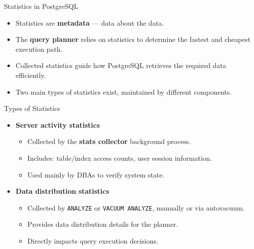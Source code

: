 \documentclass[aspectratio=169]{beamer}
\begin{document}
\begin{frame}{Statistics in PostgreSQL}
  \begin{itemize}
    \item Statistics are \textbf{metadata} — data about the data.
    \item The \textbf{query planner} relies on statistics to determine the fastest and cheapest execution path.
    \item Collected statistics guide how PostgreSQL retrieves the required data efficiently.
    \item Two main types of statistics exist, maintained by different components.
  \end{itemize}
\end{frame}

\begin{frame}{Types of Statistics}
  \begin{itemize}
    \item \textbf{Server activity statistics}
      \begin{itemize}
        \item Collected by the \textbf{stats collector} background process.
        \item Includes: table/index access counts, user session information.
        \item Used mainly by DBAs to verify system state.
      \end{itemize}
    \vspace{0.3cm}
    \item \textbf{Data distribution statistics}
      \begin{itemize}
        \item Collected by \texttt{ANALYZE} or \texttt{VACUUM ANALYZE}, manually or via autovacuum.
        \item Provides data distribution details for the planner.
        \item Directly impacts query execution decisions.
      \end{itemize}
  \end{itemize}
\end{frame}
\end{document}
